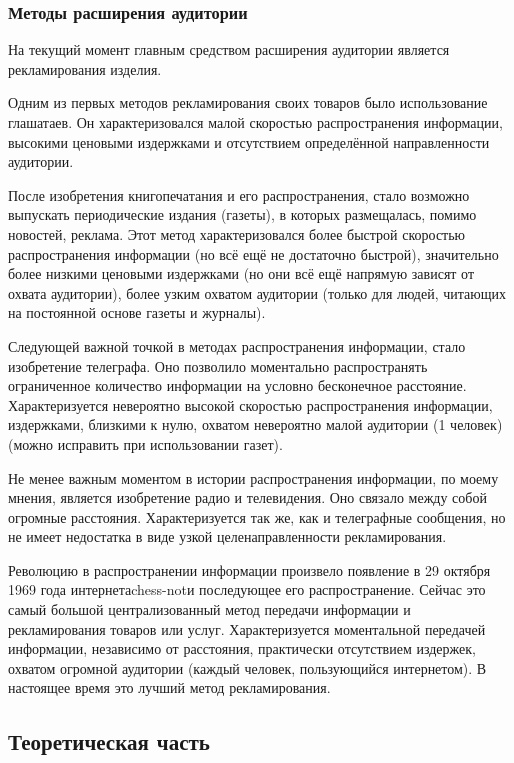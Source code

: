 \subsubsection{Методы расширения аудитории}
На текущий момент главным средством расширения аудитории является
рекламирования изделия.

Одним из первых методов рекламирования своих товаров было использование
глашатаев. Он характеризовался малой скоростью распространения информации,
высокими ценовыми издержками и отсутствием определённой направленности
аудитории.

После изобретения книгопечатания и его распространения, стало возможно
выпускать периодические издания (газеты), в которых размещалась, помимо
новостей, реклама. Этот метод характеризовался более быстрой скоростью
распространения информации (но всё ещё не достаточно быстрой), значительно
более низкими ценовыми издержками (но они всё ещё напрямую зависят от охвата
аудитории), более узким охватом аудитории (только для людей, читающих на
постоянной основе газеты и журналы).

Следующей важной точкой в методах распространения информации, стало изобретение
телеграфа. Оно позволило моментально распространять ограниченное количество
информации на условно бесконечное расстояние. Характеризуется невероятно
высокой скоростью распространения информации, издержками, близкими к нулю,
охватом невероятно малой аудитории (1 человек) (можно исправить при
использовании газет).

Не менее важным моментом в истории распространения информации, по моему мнения,
является изобретение радио и телевидения. Оно связало между собой огромные
расстояния. Характеризуется так же, как и телеграфные сообщения, но не имеет
недостатка в виде узкой целенаправленности рекламирования.

Революцию в распространении информации произвело появление в 29 октября 1969
года интернета\gls{chess-not}и последующее его распространение. Сейчас это самый большой
централизованный метод передачи информации и рекламирования товаров или услуг.
Характеризуется моментальной передачей информации, независимо от расстояния,
практически отсутствием издержек, охватом огромной аудитории (каждый человек,
пользующийся интернетом). В настоящее время это лучший метод рекламирования.

\newpage
\subsection{Теоретическая часть}
